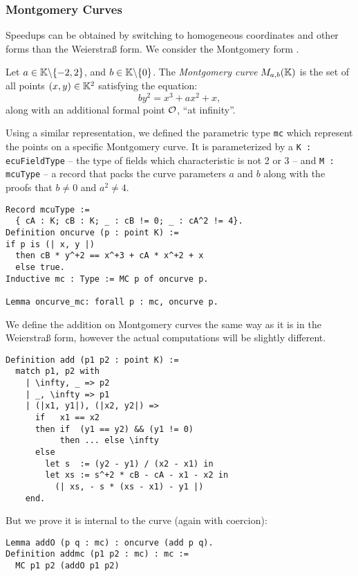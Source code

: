 \subsubsection{Montgomery Curves}
\label{subsec:ECC-Montgomery}

Speedups can be obtained by switching to homogeneous coordinates and other forms
than the Weierstra{\ss} form. We consider the Montgomery form \cite{MontgomerySpeeding}.

\begin{dfn}
  Let $a \in \mathbb{K} \backslash \{-2, 2\}$, and $b \in \mathbb{K} \backslash \{ 0\}$.
  The \textit{Montgomery curve} $M_{a,b}(\mathbb{K})$ is the set of all points $(x,y) \in \mathbb{K}^2$ satisfying the equation:
  $$by^2 = x^3 + ax^2 + x,$$
  along with an additional formal point $\mathcal{O}$, ``at infinity''.
\end{dfn}
Using a similar representation, we defined the parametric type \texttt{mc} which
represent the points on a specific Montgomery curve. It is parameterized by
a \texttt{K : ecuFieldType} -- the type of fields which characteristic is not 2 or 3 --
and \texttt{M : mcuType} -- a record that packs the curve parameters $a$ and $b$
along with the proofs that $b \neq 0$ and $a^2 \neq 4$.
\begin{lstlisting}[language=Coq]
Record mcuType :=
  { cA : K; cB : K; _ : cB != 0; _ : cA^2 != 4}.
Definition oncurve (p : point K) :=
if p is (| x, y |)
  then cB * y^+2 == x^+3 + cA * x^+2 + x
  else true.
Inductive mc : Type := MC p of oncurve p.

Lemma oncurve_mc: forall p : mc, oncurve p.
\end{lstlisting}
We define the addition on Montgomery curves the same way as it is in the Weierstra{\ss} form,
however the actual computations will be slightly different.
\begin{lstlisting}[language=Coq]
Definition add (p1 p2 : point K) :=
  match p1, p2 with
    | \infty, _ => p2
    | _, \infty => p1
    | (|x1, y1|), (|x2, y2|) =>
      if   x1 == x2
      then if  (y1 == y2) && (y1 != 0)
           then ... else \infty
      else
        let s  := (y2 - y1) / (x2 - x1) in
        let xs := s^+2 * cB - cA - x1 - x2 in
          (| xs, - s * (xs - x1) - y1 |)
    end.
\end{lstlisting}
But we prove it is internal to the curve (again with coercion):
\begin{lstlisting}[language=Coq]
Lemma addO (p q : mc) : oncurve (add p q).
Definition addmc (p1 p2 : mc) : mc :=
  MC p1 p2 (addO p1 p2)
\end{lstlisting}

